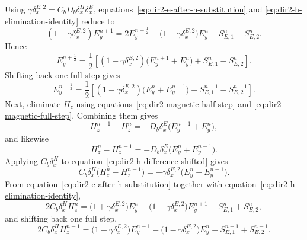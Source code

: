 \documentclass{article}
\numberwithin{figure}{section}
\begin{document}
Using $\gamma\delta_x^{E,2}=C_bD_b\delta_x^H\delta_x^E$, equations~\eqref{eq:dir2-e-after-h-substitution} and \eqref{eq:dir2-h-elimination-identity} reduce to
\begin{equation}
    \left(1-\gamma\delta_x^{E,2}\right)E_y^{n+1} = 2E_y^{n+\frac{1}{2}}-\bigl(1-\gamma\delta_x^{E,2}\bigr)E_y^n-S_{E,1}^n+S_{E,2}^n. \label{eq:dir2-e-only-first-half}
\end{equation}
Hence
\begin{equation}
    E_y^{n+\frac{1}{2}} = \frac{1}{2}\left[\left(1-\gamma\delta_x^{E,2}\right)\bigl(E_y^{n+1}+E_y^n\bigr)+S_{E,1}^n-S_{E,2}^n\right]. \label{eq:dir2-e-half-solved}
\end{equation}
Shifting back one full step gives
\begin{equation}
    E_y^{n-\frac{1}{2}} = \frac{1}{2}\left[\left(1-\gamma\delta_x^{E,2}\right)\bigl(E_y^n+E_y^{n-1}\bigr)+S_{E,1}^{n-1}-S_{E,2}^{n-1}\right]. \label{eq:dir2-e-half-solved-shifted}
\end{equation}
Next, eliminate $H_z$ using equations~\eqref{eq:dir2-magnetic-half-step} and \eqref{eq:dir2-magnetic-full-step}. Combining them gives
\begin{equation}
    H_z^{n+1}-H_z^n=-D_b\delta_x^E\bigl(E_y^{n+1}+E_y^n\bigr), \label{eq:dir2-h-difference}
\end{equation}
and likewise
\begin{equation}
    H_z^n-H_z^{n-1}=-D_b\delta_x^E\bigl(E_y^n+E_y^{n-1}\bigr). \label{eq:dir2-h-difference-shifted}
\end{equation}
Applying $C_b\delta_x^H$ to equation~\eqref{eq:dir2-h-difference-shifted} gives
\begin{equation}
    C_b\delta_x^H\bigl(H_z^n-H_z^{n-1}\bigr)=-\gamma\delta_x^{E,2}\bigl(E_y^n+E_y^{n-1}\bigr). \label{eq:dir2-h-difference-applied}
\end{equation}
From equation~\eqref{eq:dir2-e-after-h-substitution} together with equation~\eqref{eq:dir2-h-elimination-identity},
\begin{equation}
    2C_b\delta_x^H H_z^n=\bigl(1+\gamma\delta_x^{E,2}\bigr)E_y^n-\bigl(1-\gamma\delta_x^{E,2}\bigr)E_y^{n+1}+S_{E,1}^n+S_{E,2}^n, \label{eq:dir2-h-from-e}
\end{equation}
and shifting back one full step,
\begin{equation}
    2C_b\delta_x^H H_z^{n-1}=\bigl(1+\gamma\delta_x^{E,2}\bigr)E_y^{n-1}-\bigl(1-\gamma\delta_x^{E,2}\bigr)E_y^n+S_{E,1}^{n-1}+S_{E,2}^{n-1}. \label{eq:dir2-h-from-e-shifted}
\end{equation}
\end{document}
